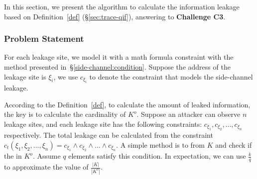 

\newcommand{\addr}[1]{{l}_{#1}}
\renewcommand{\addr}[1]{{\gamma}_{#1}}
\renewcommand{\addr}[1]{{\zeta}_{#1}}
\renewcommand{\addr}[1]{{\xi}_{#1}}

In this section, we present the algorithm to calculate the information leakage
based on Definition~\ref{def} (\S\ref{sec:trace-qif}), answering to
\textbf{Challenge C3}.

\subsubsection{Problem Statement}
For each leakage site, we model it with a math formula constraint with the
method presented in~\S\ref{side-channel:condition}. Suppose the address of the
leakage site is $\addr{i}$, we use $c_{\addr{i}}$ to denote the constraint
that models the side-channel leakage. 

According to the Definition~\ref{def}, to calculate the amount of leaked
information, the key is to calculate the cardinality
of $K^o$. Suppose an attacker can observe $n$ leakage sites, and each leakage
site has the following constraints: $c_{\addr{1}}, c_{\addr{2}}, \ldots,
c_{\addr{n}}$ respectively. The total leakage can be calculated from the constraint
$c_t({\addr{1}},{\addr{2}},\ldots,{\addr{n}}) = c_{\addr{1}} \land c_{\addr{2}}
\land \ldots \land c_{\addr{n}}$. 
A simple method is to  from $K$ and check if the
 in $K^o$. Assume $q$ elements satisfy this condition. In
expectation, we can use $\frac{k}{q}$ to approximate the value of
$\frac{|K|}{|K^o|}$.

